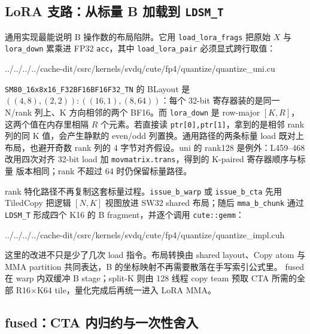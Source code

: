 \subsection{LoRA 支路：从标量 B 加载到 \texttt{LDSM\_T}}\label{sec:39-lora-b}

通用实现最能说明 B 操作数的布局陷阱。它用 \texttt{load\_lora\_frags}
把原始 $X$ 与 \texttt{lora\_down} 累乘进 FP32 \texttt{acc}，其中
\texttt{load\_lora\_pair} 必须显式跨行取值：

\begin{lstinputlisting}[linerange={87-113},firstnumber=auto,
  title={quantize\_uni.cu L87-113（通用路径的 BLayout 与标量加载）}]{../../../../cache-dit/csrc/kernels/svdq/cute/fp4/quantize/quantize_uni.cu}
\end{lstinputlisting}

\texttt{SM80\_16x8x16\_F32BF16BF16F32\_TN} 的 BLayout 是
$((4,8),(2,2)):((16,1),(8,64))$：每个 32-bit 寄存器装的是同一 N/rank
列上、K 方向相邻的两个 BF16。而 \texttt{lora\_down} 是 row-major
$[K,R]$，这两个值在内存里相隔 $R$ 个元素。若直接读
\texttt{ptr[0],ptr[1]}，拿到的是相邻 rank 列的同 K 值，会产生静默的
even/odd 列置换。通用路径的两条标量 load 既对上布局，也避开奇数 rank
列的 4 字节对齐假设。uni 的 rank128 是例外：L459--468 改用四次对齐
32-bit load 加 \texttt{movmatrix.trans}，得到的 K-paired 寄存器顺序与标量
版本相同；rank 不超过 64 时仍保留标量路径。

rank 特化路径不再复制这套标量过程。\texttt{issue\_b\_warp} 或
\texttt{issue\_b\_cta} 先用 TiledCopy 把逻辑 $[N,K]$ 视图放进 SW32 shared
布局；随后 \texttt{mma\_b\_chunk} 通过 \texttt{LDSM\_T} 形成四个 K16 的
B fragment，并逐个调用 \texttt{cute::gemm}：

\begin{lstinputlisting}[linerange={405-423},firstnumber=auto,
  title={quantize\_impl.cuh L405-423（LDSM\_T 形成 B fragment 并交给 TiledMMA）}]{../../../../cache-dit/csrc/kernels/svdq/cute/fp4/quantize/quantize_impl.cuh}
\end{lstinputlisting}

这里的改进不只是少了几次 load 指令。布局转换由 shared layout、Copy atom
与 MMA partition 共同表达，B 的坐标映射不再需要散落在手写索引公式里。
fused 在 warp 内双缓冲 B stage；split-K 则由 128 线程 copy team 预取 CTA
所需的全部 R16$\times$K64 tile，量化完成后再统一进入 LoRA MMA。

\subsection{fused：CTA 内归约与一次性舍入}

